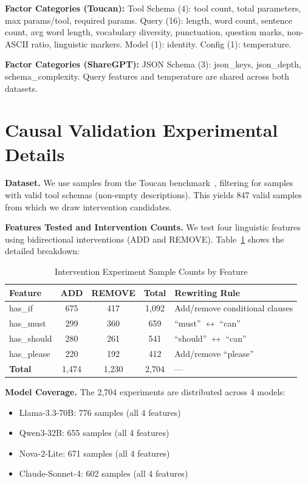 \documentclass[sigconf,anonymous,review]{acmart}
\begin{document}
\textbf{Factor Categories (Toucan):} Tool Schema (4): tool count, total parameters, max params/tool, required params. Query (16): length, word count, sentence count, avg word length, vocabulary diversity, punctuation, question marks, non-ASCII ratio, linguistic markers. Model (1): identity. Config (1): temperature.

\textbf{Factor Categories (ShareGPT):} JSON Schema (3): json\_keys, json\_depth, schema\_complexity. Query features and temperature are shared across both datasets.

\section{Causal Validation Experimental Details}
\label{app:causal_details}

\textbf{Dataset.} We use samples from the Toucan benchmark~\cite{toucan2025}, filtering for samples with valid tool schemas (non-empty descriptions). This yields 847 valid samples from which we draw intervention candidates.

\textbf{Features Tested and Intervention Counts.} We test four linguistic features using bidirectional interventions (ADD and REMOVE). Table~\ref{tab:intervention_counts} shows the detailed breakdown:

\begin{table}[h]
\centering
\caption{Intervention Experiment Sample Counts by Feature}
\label{tab:intervention_counts}
\small
\begin{tabular}{@{}lcccp{4cm}@{}}
\toprule
\textbf{Feature} & \textbf{ADD} & \textbf{REMOVE} & \textbf{Total} & \textbf{Rewriting Rule} \\
\midrule
has\_if & 675 & 417 & 1,092 & Add/remove conditional clauses \\
has\_must & 299 & 360 & 659 & ``must'' $\leftrightarrow$ ``can'' \\
has\_should & 280 & 261 & 541 & ``should'' $\leftrightarrow$ ``can'' \\
has\_please & 220 & 192 & 412 & Add/remove ``please'' \\
\midrule
\textbf{Total} & 1,474 & 1,230 & 2,704 & --- \\
\bottomrule
\end{tabular}
\end{table}

\textbf{Model Coverage.} The 2,704 experiments are distributed across 4 models:
\begin{itemize}
    \item Llama-3.3-70B: 776 samples (all 4 features)
    \item Qwen3-32B: 655 samples (all 4 features)
    \item Nova-2-Lite: 671 samples (all 4 features)
    \item Claude-Sonnet-4: 602 samples (all 4 features)
\end{itemize}
\end{document}
